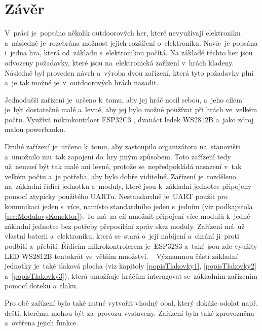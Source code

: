 \chapter*{Závěr}
{}

V~práci je~popsáno několik outdoorových her, které nevyužívají elektroniku a~následně je~rozebrána možnost jejich rozšíření o~elektroniku.
Navíc~je popsána i~jedna hra, která od~základu s~elektronikou počítá.
Na základě těchto her jsou odvozeny požadavky, které jsou na~elektronická zařízení v~hrách kladeny.
Následně byl proveden návrh a~výroba dvou zařízení, která tyto požadavky plní a~je tak možné je~v~outdoorových hrách nasadit.

Jednodušší zařízení je~určeno k~tomu, aby jej hráč nosil sebou, a~jeho cílem je~být dostatečně malé a~levné, aby jej bylo možné používat při hrách ve~velkém počtu.
Využívá mikrokontrloer ESP32C3 \cite{ESP32C3}, dvanáct ledek WS2812B \cite{WS2812B} a~jako zdroj malou powerbanku.

Druhé zařízení je~určeno k~tomu, aby zastoupilo organizátora na~stanovišti a~umožnilo mu~tak zapojení do~hry jiným způsobem.
Toto zařízení tedy už~nemusí být tak malé ani levné, protože se~nepředpokládá nasazení v~tak velkém počtu a~je potřeba, aby bylo dobře viditelné.
Zařízení je~rozděleno na~základní řídící jednotku a~moduly, které jsou k~základní jednotce připojeny pomocí atypicky použitého UARTu.
Nestandardně je~UART použit pro komunikaci jeden s~více, namísto standardního jeden s~jedním (viz podkapitola \ref{sec:ModulovyKonektor}).
To má~za cíl umožnit připojení více modulů k~jedné základní jednotce bez potřeby přeposílání zpráv skrz moduly.
Zařízení má~už vlastní baterii a~elektroniku, která se~stará o~její nabíjení a~chrání ji~proti podbití a~přebití.
Řídícím mikrokontrolerem je~ESP32S3 \cite{ESP32S3} a~také jsou zde využity LED WS2812B tentokrát ve~větším množství.  ~
Významnou částí základní jednotky je~také tlaková plocha (viz kapitoly \ref{popisTlakovky1}, \ref{popisTlakovky2} a~\ref{popisTlakovky3}), která umožňuje hráčům interagovat se~základním zařízením pomocí doteku a~tlaku.

Pro obě zařízení bylo také nutné vytvořit vhodný obal, který dokáže odolat např. dešti, kterému mohou být za~provozu vystaveny.
Zařízení byla také zprovozněna a~ověřena jejich funkce.